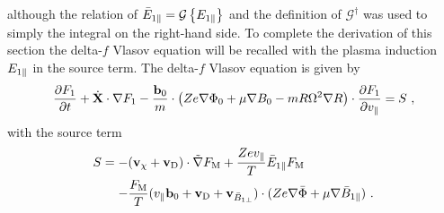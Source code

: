 although the relation of $\bar{E}_{1\parallel} =  \mathcal{G} \left\{E_{1\parallel}\right\}$ and the definition of $\mathcal{G}^\dagger$ was used to simply the integral on the right-hand side. 
To complete the derivation of this section the delta-\!$f$ Vlasov equation will be recalled with the plasma induction $E_{1\parallel}$ in the source term. The delta-\!$f$ Vlasov equation is given by
\begin{gather}
	\frac{\partial F_1}{\partial t} + \dot{\boldsymbol{\mathbf{X}}} \cdot \nabla F_1 - \frac{\boldsymbol{\mathbf{b}}_0}{m} \cdot \left(Ze\nabla \Phi_0 + \mu \nabla B_0 - mR \Omega^2 \nabla R \right) \cdot \frac{\partial F_1}{\partial v_\parallel} = S~,
	\label{eq:gyrocenterDeltafSubVlasovRecall}
\end{gather}
with the source term
\begin{gather}
	\begin{aligned}
		S = -& (\boldsymbol{\mathbf{v}}_\chi + \boldsymbol{\mathbf{v}}_\mathrm{D}) \cdot \tilde{\nabla} F_\mathrm{M} + \frac{Z e v_\parallel}{T} \bar{E}_{1\parallel} F_\mathrm{M} \\
		    -& \frac{F_\mathrm{M}}{T} (v_\parallel \boldsymbol{\mathbf{b}}_0 + \boldsymbol{\mathbf{v}}_\mathrm{D} + \boldsymbol{\mathbf{v}}_{\bar{B}_{1\perp}}) \cdot (Z e \nabla \bar{\Phi} + \mu \nabla \bar{B}_{1\parallel})~.
	\end{aligned}
	\label{eq:sourceTermElectric}
\end{gather}

